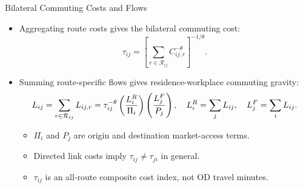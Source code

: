 \documentclass[11pt,aspectratio=169]{beamer}
\newcommand{\R}{\mathcal{R}}
\begin{document}
\begin{frame}[label=bilateral]{Bilateral Commuting Costs and Flows}
\begin{itemize}\small
  \item Aggregating route costs gives the bilateral commuting cost:
  \vspace{-0.5em}\begin{equation}\label{eq:bilateral}
    \tau_{ij} = \left[\sum_{r\in\R_{ij}} C_{ij,r}^{-\theta}\right]^{-1/\theta}.
  \end{equation}
  \vspace{-0.5em}
  \item Summing route-specific flows gives residence-workplace commuting gravity:
  \vspace{-0.35em}\begin{equation}\label{eq:gravity}
    L_{ij}=\sum_{r\in\R_{ij}}L_{ij,r}
    =\tau_{ij}^{-\theta}\left(\frac{L_i^R}{\Pi_i}\right)\left(\frac{L_j^F}{P_j}\right),
    \quad L_i^R=\sum_jL_{ij},\quad L_j^F=\sum_iL_{ij}.
  \vspace{-0.8em}\end{equation}
  \begin{itemize}\footnotesize
    \item $\Pi_i$ and $P_j$ are origin and destination market-access terms.
    \item Directed link costs imply $\tau_{ij}\neq\tau_{ji}$ in general.
    \item $\tau_{ij}$ is an all-route composite cost index, not OD travel minutes.
  \end{itemize}
\end{itemize}
\end{frame}
\end{document}

